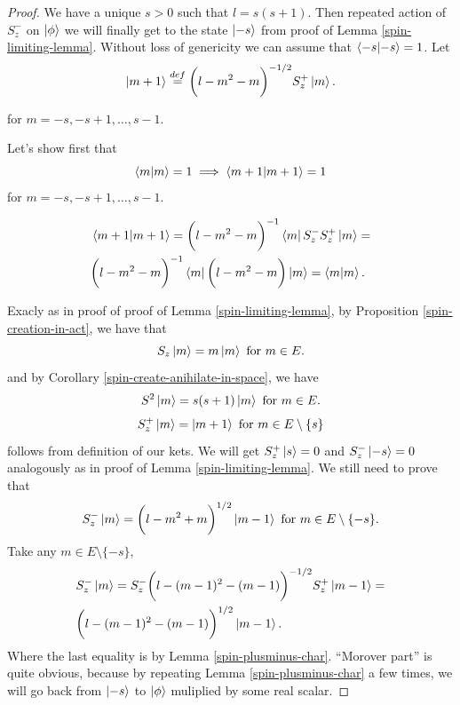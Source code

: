 \documentclass[main.tex]{subfiles}
\begin{document}
\begin{proof}
We have a unique $s > 0$ such that $l = s(s + 1)$.
Then repeated action of $S^{-}_z$ on $\ket{\phi}$ we will finally get to the state $\ket{-s}$ from proof of Lemma \ref{spin-limiting-lemma}. Without loss of genericity we can assume that $\bra{-s}\ket{-s} = 1$.
Let 
\begin{equation}
\ket{m + 1} \stackrel{def}{=} \bigg(l - m^2 - m\bigg)^{-1/2} S^{+}_z \ket{m}.
\end{equation}

for $m = -s, -s + 1, \dots, s - 1$.

Let's show first that
\begin{equation}
\bra{m}\ket{m} = 1 \implies \bra{m + 1}\ket{m + 1} = 1
\end{equation} 
for $m = -s, -s + 1, \dots, s - 1$.

\begin{align}
& \bra{m + 1}\ket{m + 1} = \bigg(l - m^2 - m\bigg)^{-1} \bra{m}S^{-}_z S^{+}_z\ket{m} = \\
& \bigg(l - m^2 - m\bigg)^{-1}\bra{m} \bigg(l - m^2 - m\bigg)\ket{m} = \bra{m}\ket{m}.
\end{align}

Exacly as in proof of proof of Lemma \ref{spin-limiting-lemma}, by Proposition \ref{spin-creation-in-act}, we have that
\begin{equation}
S_z \ket{m} = m \ket{m} \text{ for } m\in E.
\end{equation}
and by Corollary \ref{spin-create-anihilate-in-space}, we have
\begin{equation}
S^2 \ket{m} = s(s + 1) \ket{m} \text{ for } m\in E. 
\end{equation}
\begin{equation}
S^{+}_z\ket{m} = \ket{m + 1} \text{ for } m\in E\setminus\{s\}
\end{equation}
follows from definition of our kets. We will get $S^{+}_z\ket{s} = 0$ and $S^{-}_z\ket{-s} = 0$ analogously as in proof of Lemma \ref{spin-limiting-lemma}.
We still need to prove that
$$S^{-}_z\ket{m} = \bigg(l - m^2 + m\bigg)^{1/2} \ket{m - 1} \text{ for } m\in E\setminus\{-s\}.$$
Take any $m\in E\setminus\{-s\}$,
\begin{align}
& S^{-}_z\ket{m} = S^{-}_z  \bigg(l - (m-1)^2 - (m-1)\bigg)^{-1/2} S^{+}_z\ket{m - 1} = \\ & \bigg(l - (m-1)^2 - (m-1)\bigg)^{1/2} \ket{m - 1}.
\end{align}
Where the last equality is by Lemma \ref{spin-plusminus-char}.
``Morover part'' is quite obvious, because by repeating Lemma \ref{spin-plusminus-char} a few times, we will go back from $\ket{-s}$ to $\ket{\phi}$ muliplied by some real scalar. 
\end{proof}
\end{document}
